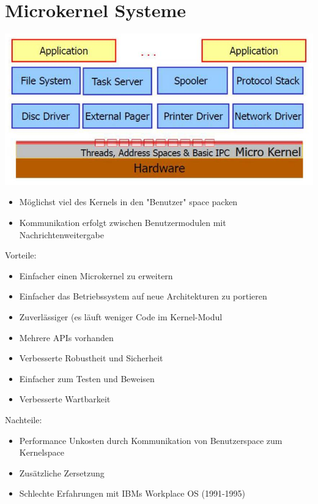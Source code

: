 \documentclass[a4paper]{scrreprt}
\begin{document}
\section{Microkernel Systeme}
	\begin{center}
		\includegraphics[scale=0.3]{graphics/microkernel.png}
	\end{center}

	\begin{itemize}
		\item Möglichst viel des Kernels in den "Benutzer" space packen
		\item Kommunikation erfolgt zwischen Benutzermodulen mit Nachrichtenweitergabe
	\end{itemize}
	
	Vorteile:
		\begin{itemize}
			\item Einfacher einen Microkernel zu erweitern
			\item Einfacher das Betriebssystem auf neue Architekturen zu portieren
			\item Zuverlässiger (es läuft weniger Code im Kernel-Modul
			\item Mehrere APIs vorhanden
			\item Verbesserte Robustheit und Sicherheit
			\item Einfacher zum Testen und Beweisen
			\item Verbesserte Wartbarkeit
		\end{itemize}
	Nachteile:
		\begin{itemize}
			\item Performance Unkosten durch Kommunikation von Benutzerspace zum Kernelspace 
			\item Zusätzliche Zersetzung
			\item Schlechte Erfahrungen mit IBMs Workplace OS (1991-1995)
		\end{itemize}
\end{document}
